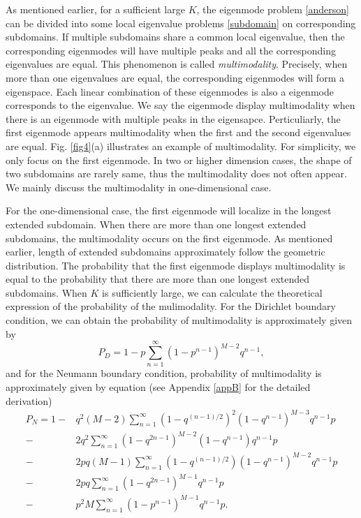 \documentclass[a4paper,11pt]{article}
\begin{document}
As mentioned earlier, for a sufficient large $K$, the eigenmode problem \eqref{anderson} can be divided into some local eigenvalue problems \eqref{subdomain} on corresponding subdomains. If multiple subdomains share a common local eigenvalue, then the corresponding eigenmodes will have multiple peaks and all the corresponding eigenvalues are equal. This phenomenon is called \emph{multimodality}. Precisely, when more than one eigenvalues are equal, the corresponding eigenmodes will form a eigenspace. Each linear combination of these eigenmodes is also a eigenmode corresponds to the eigenvalue. We say the eigenmode display multimodality when there is an eigenmode with multiple peaks in the eigensapce. Perticuliarly, the first eigenmode appears multimodality when the first and the second eigenvalues are equal. Fig. \ref{fig4}(a) illustrates an example of multimodality. For simplicity, we only focus on the first eigenmode. In two or higher dimension cases, the shape of two subdomains are rarely same, thus the multimodality does not often appear. We mainly discuss the multimodality in one-dimensional case.

For the one-dimensional case, the first eigenmode will localize in the longest extended subdomain. When there are more than one longest extended subdomains, the multimodality occurs on the first eigenmode. As mentioned earlier, length of extended subdomains approximately follow the geometric distribution. The probability that the first eigenmode displays multimodality is equal to the probability that there are more than one longest extended subdomains. When $K$ is sufficiently large, we can calculate the theoretical expression of the probability of the mulimodality. For the Dirichlet boundary condition, we can obtain the probability of multimodality is approximately given by
\begin{equation}\label{multiD}
P_D = 1 - p \sum_{n=1}^{\infty} (1 - p^{n-1})^{M-2} q^{n-1},
\end{equation}
and for the Neumann boundary condition, probability of multimodality is approximately given by equation (see Appendix \ref{appB} for the detailed derivation)
\begin{equation}\label{multiN}
\begin{split}
P_N = 1 - & q^2 (M-2) \sum_{n=1}^{\infty} (1 - q^{(n-1)/2})^2 (1 - q^{n-1})^{M-3} q^{n-1} p \\
- & 2 q^2 \sum_{n=1}^{\infty} (1 - q^{2n-1})^{M-2} (1 - q^{n-1}) q^{n-1} p \\
- & 2 p q (M-1) \sum_{n=1}^{\infty} (1 - q^{(n-1)/2}) (1 - q^{n-1})^{M-2} q^{n-1} p \\
- & 2 p q \sum_{n=1}^{\infty} (1 - q^{2n-1})^{M-1} q^{n-1} p \\
- & p^2 M \sum_{n=1}^{\infty} (1 - p^{n-1})^{M-1} q^{n-1} p.
\end{split}
\end{equation}
\end{document}

